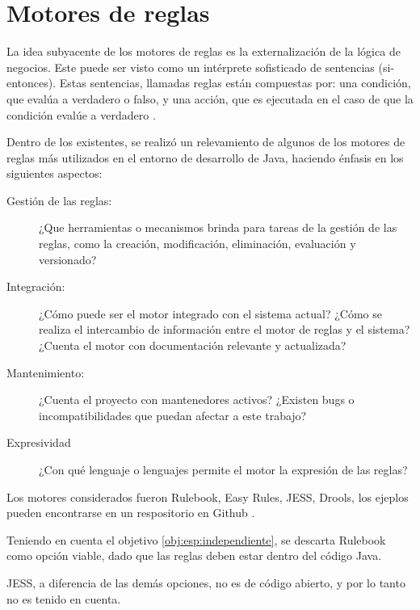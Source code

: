 \section{Motores de reglas}\label{sec:motores}

La idea subyacente de los motores de reglas es la externalización de la lógica de negocios. Este puede ser visto como un intérprete sofisticado de sentencias  (si-entonces). Estas sentencias, llamadas reglas están compuestas por: una condición, que evalúa a verdadero o falso, y una acción, que es ejecutada en el caso de que la condición evalúe a verdadero \cite{qusay2005jsr94}.

Dentro de los existentes, se realizó un relevamiento de algunos de los motores de reglas más utilizados en el entorno de desarrollo de Java, haciendo énfasis en los siguientes aspectos:
\begin{description}
    \item[Gestión de las reglas:] 
    ¿Que herramientas o mecanismos brinda para tareas de la gestión de las reglas, como la creación, modificación, eliminación, evaluación y versionado?
    \item[Integración:]
    ¿Cómo puede ser el motor integrado con el sistema actual? ¿Cómo se realiza el intercambio de información entre el motor de reglas y el sistema? ¿Cuenta el motor con documentación relevante y actualizada?
    \item[Mantenimiento:]
    ¿Cuenta el proyecto con mantenedores activos? ¿Existen bugs o incompatibilidades que puedan afectar a este trabajo?
    \item[Expresividad]
    ¿Con qué lenguaje o lenguajes permite el motor la expresión de las reglas?
\end{description}

Los motores considerados fueron Rulebook, Easy Rules, JESS, Drools, los ejeplos pueden encontrarse en un respositorio en Github \cite{ejemplos}.

Teniendo en cuenta el objetivo \ref{obj:esp:independiente}, se descarta Rulebook como opción viable, dado que las reglas deben estar dentro del código Java.


JESS, a diferencia de las demás opciones, no es de código abierto, y por lo tanto no es tenido en cuenta.

